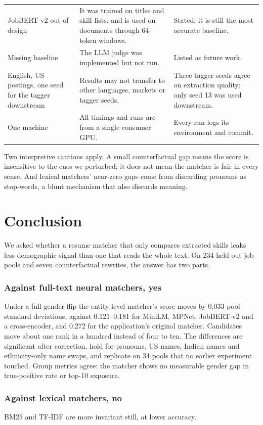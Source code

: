 \documentclass[conference,a4paper]{IEEEtran}
\begin{document}
\begin{table}[!t]
\begin{tabularx}{\textwidth}{>{\raggedright\arraybackslash}X>{\raggedright\arraybackslash}X>{\raggedright\arraybackslash}X}
JobBERT-v2 out of design & It was trained on titles and skill lists, and is used on documents through 64-token windows. & Stated; it is still the most accurate baseline. \\
Missing baseline & The LLM judge was implemented but not run. & Listed as future work. \\
English, US postings, one seed for the tagger downstream & Results may not transfer to other languages, markets or tagger seeds. & Three tagger seeds agree on extraction quality; only seed 13 was used downstream. \\
One machine & All timings and runs are from a single consumer GPU. & Every run logs its environment and commit. \\
\hline
\end{tabularx}
\end{table}
Two interpretive cautions apply. A small counterfactual gap means the score is insensitive to the cues we perturbed; it does not mean the matcher is fair in every sense. And lexical matchers' near-zero gaps come from discarding pronouns as stop-words, a blunt mechanism that also discards meaning.

\section{Conclusion}
We asked whether a resume matcher that only compares extracted skills leaks less demographic signal than one that reads the whole text. On 234 held-out job pools and seven counterfactual rewrites, the answer has two parts.

\subsubsection{Against full-text neural matchers, yes} Under a full gender flip the entity-level matcher's score moves by 0.033 pool standard deviations, against 0.121–0.181 for MiniLM, MPNet, JobBERT-v2 and a cross-encoder, and 0.272 for the application's original matcher. Candidates move about one rank in a hundred instead of four to ten. The differences are significant after correction, hold for pronouns, US names, Indian names and ethnicity-only name swaps, and replicate on 34 pools that no earlier experiment touched. Group metrics agree: the matcher shows no measurable gender gap in true-positive rate or top-10 exposure.

\subsubsection{Against lexical matchers, no} BM25 and TF-IDF are more invariant still, at lower accuracy.
\end{document}
